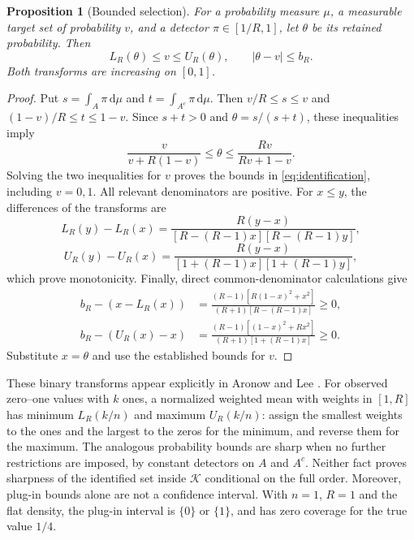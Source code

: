 \documentclass[11pt]{article}
\newtheorem{proposition}[theorem]{Proposition}
\theoremstyle{remark}
\newcommand{\K}{\mathcal K}
\newcommand{\dd}{\,\mathrm d}
\begin{document}
\begin{proposition}[Bounded selection]\label{prop:selection}
For a probability measure $\mu$, a measurable target set of probability
$v$, and a detector $\pi\in[1/R,1]$, let $\theta$ be its retained
probability. Then
\begin{equation}\label{eq:identification}
 L_R(\theta)\le v\le U_R(\theta),\qquad |\theta-v|\le b_R.
\end{equation}
Both transforms are increasing on $[0,1]$.
\end{proposition}
\begin{proof}
Put $s=\int_A\pi\dd\mu$ and $t=\int_{A^c}\pi\dd\mu$. Then
$v/R\le s\le v$ and $(1-v)/R\le t\le1-v$.
Since $s+t>0$ and $\theta=s/(s+t)$, these inequalities imply
\[
 \frac{v}{v+R(1-v)}\le\theta\le
 \frac{Rv}{Rv+1-v}.
\]
Solving the two inequalities for $v$ proves the bounds in
\eqref{eq:identification}, including $v=0,1$. All relevant denominators
are positive. For $x\le y$, the differences of the transforms are
\[
 L_R(y)-L_R(x)=\frac{R(y-x)}{[R-(R-1)x][R-(R-1)y]},
\]
\[
 U_R(y)-U_R(x)=\frac{R(y-x)}{[1+(R-1)x][1+(R-1)y]},
\]
which prove monotonicity. Finally, direct common-denominator calculations
give
\begin{align*}
 b_R-(x-L_R(x))&=
 \frac{(R-1)[R(1-x)^2+x^2]}{(R+1)[R-(R-1)x]}\ge0,\\
 b_R-(U_R(x)-x)&=
 \frac{(R-1)[(1-x)^2+Rx^2]}{(R+1)[1+(R-1)x]}\ge0.
\end{align*}
Substitute $x=\theta$ and use the established bounds for $v$.
\end{proof}

These binary transforms appear explicitly in Aronow and Lee
\cite[p.~237]{aronow}. For observed zero--one values with $k$ ones, a
normalized weighted mean with weights in $[1,R]$ has minimum $L_R(k/n)$
and maximum $U_R(k/n)$: assign the smallest weights to the ones and the
largest to the zeros for the minimum, and reverse them for the maximum.
The analogous probability bounds are sharp when no further restrictions
are imposed, by constant detectors on $A$ and $A^c$. Neither fact proves
sharpness of the identified set inside $\K$ conditional on the full order.
Moreover, plug-in bounds alone are not a confidence interval. With
$n=1$, $R=1$ and the flat density, the plug-in interval is $\{0\}$ or
$\{1\}$, and has zero coverage for the true value $1/4$.
\end{document}
